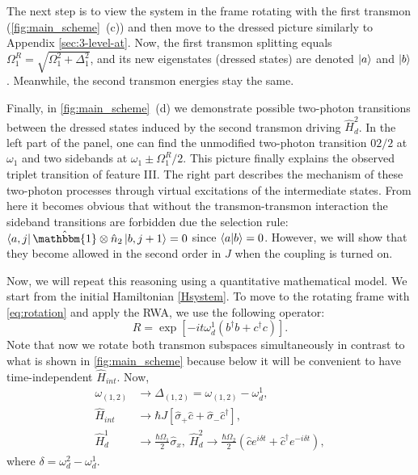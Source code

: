 \documentclass[%
 pra,
 amsmath,amssymb,
 reprint,%
]{revtex4-1}
\begin{document}
The next step is to view the system in the frame 
rotating with the first transmon 
(\autoref{fig:main_scheme}~(c)) and then move to 
the  dressed picture similarly to Appendix 
\ref{sec:3-level-at}. Now, the first transmon 
splitting equals $\Omega_{1}^R = 
\sqrt{\Omega_1^2+\Delta_1^2}$, and its new 
eigenstates (dressed states) are denoted 
$\ket{a}$ and $\ket{b}$. Meanwhile, the second 
transmon energies stay the same.


Finally, in \autoref{fig:main_scheme}~(d) we demonstrate possible two-photon transitions between the dressed states induced by the second transmon driving $\hat H_{d}^2$. In the left part of the panel, one can find the unmodified two-photon transition $02/2$ at $\omega_1$ and two sidebands at $\omega_1 \pm \Omega_1^R/2$. This picture finally explains the observed triplet transition of feature III. The right part describes the mechanism of these two-photon processes through virtual excitations of the intermediate states. From here it becomes obvious that without the transmon-transmon interaction the sideband transitions are forbidden due the selection rule: $\bra{a,j}\hat{\mathbbm{1}}\otimes \hat n_2 \ket{b, j+1} = 0$ since $\braket{a}{b} = 0$. However, we will show that they become allowed in the second order in $J$ when the coupling is turned on.

Now, we will repeat this reasoning using a 
quantitative mathematical model. We start from 
the initial Hamiltonian \autoref{Hsystem}. To 
move to the rotating frame with 
\autoref{eq:rotation} and apply the RWA, we use 
the following operator:
\begin{equation}
R = \exp[-it \omega_d^1 
(b^{\dagger}b+c^{\dagger}c)].
\end{equation}  
Note that now we rotate both transmon subspaces simultaneously in contrast to what is shown in \autoref{fig:main_scheme} because below it will be convenient to have time-independent $\hat H_{int}$. Now,
\begin{equation}
\begin{aligned}
\omega_{(1,2)} &\rightarrow \Delta_{(1,2)} = \omega_{(1,2)} - \omega_d^{1},\\
\hat H_{int} &\rightarrow  \hbar J \left[\hat \sigma_+ \hat c + \hat \sigma_-\hat c^\dag \right],\\
\hat H_{d}^1 &\rightarrow \frac{\hbar \Omega_1}{2} \hat \sigma_x,\ 
\hat H_{d}^2 \rightarrow \frac{\hbar \Omega_2}{2}(\hat c e^{i\delta t}  + \hat c^\dag e^{-i\delta t}),
\end{aligned}
\end{equation}
where $\delta = \omega_{d}^2 - \omega_{d}^1$.
\end{document}
